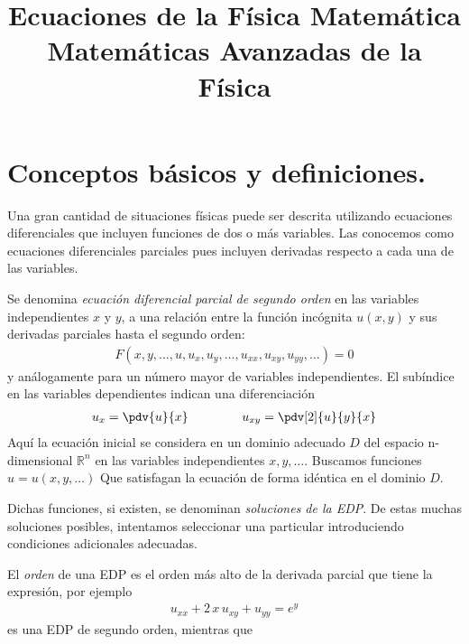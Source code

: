 
\author{}
\title{Ecuaciones de la Física Matemática \\ {\large Matemáticas Avanzadas de la Física}\vspace{-1.5\baselineskip}}
\date{}
\author{}

\maketitle
\fontsize{14}{14}\selectfont
\section{Conceptos básicos y definiciones.}
Una gran cantidad de situaciones físicas puede ser descrita utilizando ecuaciones diferenciales que incluyen funciones de dos o más variables. Las conocemos como ecuaciones diferenciales parciales pues incluyen derivadas respecto a cada una de las variables.
\par
Se denomina \emph{ecuación diferencial parcial de segundo orden} en las variables independientes $x$ y $y$, a una relación entre la función incógnita $u(x, y)$ y sus derivadas parciales hasta el segundo orden:
\begin{align*}
F (x, y, \ldots, u, u_{x}, u_{y}, \ldots, u_{xx}, u_{xy}, u_{yy}, \ldots) = 0
\end{align*}
y análogamente para un número mayor de variables independientes. El subíndice en las variables dependientes indican una diferenciación
\begin{align*}
u_{x} = \pdv{u}{x} \hspace{1.5cm} u_{x y} = \pdv[2]{u}{y}{x}
\end{align*}
Aquí la ecuación inicial se considera en un dominio adecuado $D$ del espacio n-dimensional $\mathbb{R}^{n}$ en las variables independientes $x, y, \ldots$. Buscamos funciones $u = u (x, y, \ldots)$ Que satisfagan la ecuación de forma idéntica en el dominio $D$.
\par
Dichas funciones, si existen, se denominan \emph{soluciones de la EDP}. De estas muchas soluciones posibles, intentamos seleccionar una particular introduciendo condiciones adicionales adecuadas.
\par
El \emph{orden} de una EDP es el orden más alto de la derivada parcial que tiene la expresión, por ejemplo
\begin{align*}
u_{x x} + 2 \, x \, u_{x y} + u_{y y} = e^{y}
\end{align*}
es una EDP de segundo orden, mientras que
